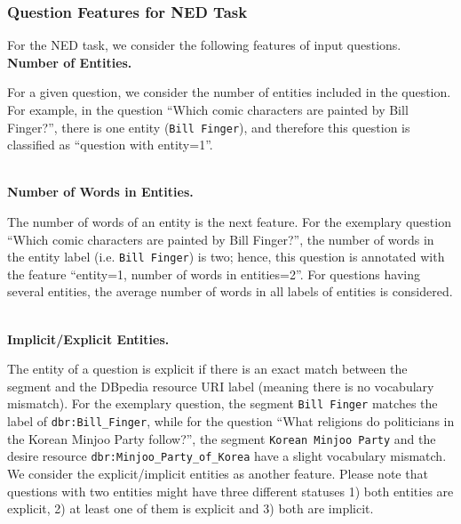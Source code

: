 \documentclass[sigconf,edbt]{acmart-edbt2019}
\newcommand{\qq}[1]{``#1''}
\begin{document}
\subsubsection{Question Features for NED Task}
For the NED task, we consider the following features of input questions.
~\\
{\bf Number of Entities.} \begin{inparaenum}
For a given question, we consider the number of entities included in the question. For example, in the question \qq{Which comic characters are painted by Bill Finger?}, there is one entity (\texttt{Bill Finger}), and therefore this question is classified as ``question with entity=1''.
\end{inparaenum}
~\\
{\bf Number of Words in Entities.} \begin{inparaenum}
The number of words of an entity is the next feature. 
For the exemplary question \qq{Which comic characters are painted by Bill Finger?}, the number of words in the entity label (i.e. \texttt{Bill Finger}) is two; hence, this question is annotated with the feature ``entity=1, number of words in entities=2''. For questions having several entities, the average number of words in all labels of entities is considered.
\end{inparaenum}
~\\
{\bf Implicit/Explicit Entities.} \begin{inparaenum}
The entity of a question is explicit if there is an exact match between the segment and the DBpedia resource URI label (meaning there is no vocabulary mismatch). For the exemplary question, the segment \texttt{Bill Finger} matches the label of \texttt{dbr:Bill\_Finger}, while for the question \qq{What religions do politicians in the Korean Minjoo Party follow?}, the segment \texttt{Korean Minjoo Party} and the desire resource \texttt{dbr:Minjoo\_Party\_of\_Korea} have a slight vocabulary mismatch.
We consider the explicit/implicit entities as another feature. 
Please note that questions with two entities might have three different statuses 1) both entities are explicit, 2) at least one of them is explicit and 3) both are implicit.
\end{inparaenum}
\end{document}
